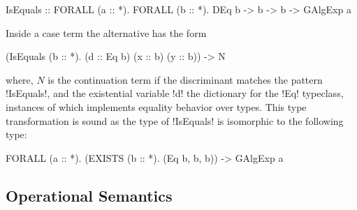 \documentclass[screen,nonacm,manuscript,review]{acmart} %
\begin{document}
\begin{CenteredBox}
\begin{code}
IsEquals :: FORALL (a :: *). FORALL (b :: *). DEq b -> b -> b -> GAlgExp a
\end{code}
\end{CenteredBox}

Inside a case term the alternative has the form

\begin{CenteredBox}
\begin{code}
(IsEquals (b :: *). (d :: Eq b) (x :: b) (y :: b)) -> N
\end{code}
\end{CenteredBox}

where, $N$ is the continuation term if the discriminant matches the pattern
!IsEquals!, and the existential variable !d! the dictionary for the !Eq!
typeclass, instances of which implements equality behavior over types.
This type transformation is sound as the type of !IsEquals! is
isomorphic to the following type:

\begin{CenteredBox}
\begin{code}
FORALL (a :: *). (EXISTS (b :: *). (Eq b, b, b)) -> GAlgExp a
\end{code}
\end{CenteredBox}

\subsection{Operational Semantics}\label{sec:sfc-op-sem}
\newcommand{\Beta}{
 \ib{\irule[\trule{$\beta$}]
 {};
 {$\stepsto {(\Lam {x\co\tau} M) \App N} {\Set{x\mapsto N}M}$}
 }
}
\newcommand{\TBeta}{
 \ib{\irule[\trule{Ty-$\beta$}]
 {};
 {$\stepsto {(\TLam \TyVar M) \App \tau} {\Set{\TyVar\mapsto \tau}M}$}
 }
}
\newcommand{\CaseE}{
 \ib{\irule[\trule{case}]
 {};
 {\stepsto {\Case {(H\App\many\sigma\App\many\phi\App\many\Tm)} {\Set{...; H\App\many\beta\App\many x \to N; ...}}} {\Set{\many {\beta\mapsto\phi}, \many{x\mapsto\Tm}}N}}
 }
}
\newcommand{\CoTransE}{
 \ib{\irule[\trule{Co-Trans}]
 {};
 {$\stepsto {\Cast {(\Cast \Val \Co)} {\nu}} {\Cast \Val {(\Trans{\Co} {\nu})}}$}
 }
}

\newcommand{\TyPush}{
 \ib{\irule[\trule{ty-push}];
 {$\stepsto {(\Cast{\TLam {\TyVar\co\kappa} M}\Co)\App \tau} {({\TLam {\TyVar\co\kappa} (\Cast M {\Co\At\TyVar})})\App \tau}$}
 }
}
\end{document}
